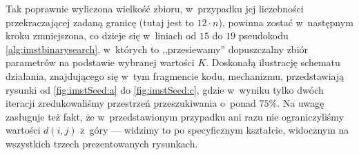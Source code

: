 Tak poprawnie wyliczona wielkość zbioru, w~przypadku jej liczebności przekraczającej zadaną granicę (tutaj jest to $12 \cdot n$), powinna zostać w~następnym kroku zmniejszona, co dzieje się w~liniach od $15$ do $19$ pseudokodu \ref{alg:imstbinarysearch}, w~których to ,,przesiewamy'' dopuszczalny zbiór parametrów na podstawie wybranej wartości $K$. Doskonałą ilustrację schematu działania, znajdującego się w~tym fragmencie kodu, mechanizmu, przedstawiają rysunki od \ref{fig:imstSeed:a} do \ref{fig:imstSeed:c}, gdzie w~wyniku tylko dwóch iteracji zredukowaliśmy przestrzeń przeszukiwania o~ponad $75\%$. Na uwagę zasługuje też fakt, że w~przedstawionym przypadku ani razu nie ograniczyliśmy wartości $d \left( i, j \right)$ z~góry --- widzimy to po specyficznym kształcie, widocznym na wszystkich trzech prezentowanych rysunkach.

